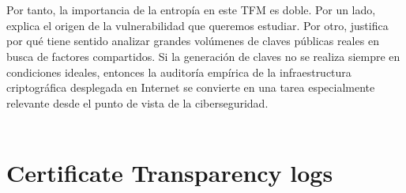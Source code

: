 \\
\\
Por tanto, la importancia de la entropía en este TFM es doble. Por un lado, explica el origen de la vulnerabilidad que queremos estudiar. Por otro, justifica por qué tiene sentido analizar grandes volúmenes de claves públicas reales en busca de factores compartidos. Si la generación de claves no se realiza siempre en condiciones ideales, entonces la auditoría empírica de la infraestructura criptográfica desplegada en Internet se convierte en una tarea especialmente relevante desde el punto de vista de la ciberseguridad.
\\
\\

\section{Certificate Transparency logs}

